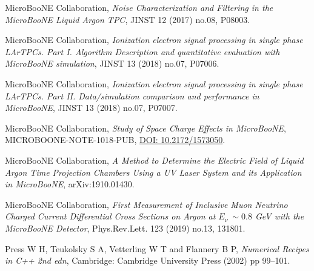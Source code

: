 \documentclass[a4paper]{article}
\begin{document}
\begin{thebibliography}{}
MicroBooNE Collaboration, \emph{Noise Characterization and Filtering in the MicroBooNE Liquid Argon TPC}, JINST 12 (2017) no.08, P08003.

MicroBooNE Collaboration, \emph{Ionization electron signal processing in single phase LArTPCs. Part I. Algorithm Description and quantitative evaluation with MicroBooNE simulation}, JINST 13 (2018) no.07, P07006.

MicroBooNE Collaboration, \emph{Ionization electron signal processing in single phase LArTPCs. Part II. Data/simulation comparison and performance in MicroBooNE}, JINST 13 (2018) no.07, P07007.

MicroBooNE Collaboration, \emph{Study of Space Charge Effects in MicroBooNE}, MICROBOONE-NOTE-1018-PUB, \href{http://inspirehep.net/record/1763018}{DOI: 10.2172/1573050}.

MicroBooNE Collaboration, \emph{A Method to Determine the Electric Field of Liquid Argon Time Projection Chambers Using a UV Laser System and its Application in MicroBooNE},  arXiv:1910.01430.

MicroBooNE Collaboration, \emph{First Measurement of Inclusive Muon Neutrino Charged Current Differential Cross Sections on Argon at $E_\nu ~\sim0.8$ GeV with the MicroBooNE Detector}, Phys.Rev.Lett. 123 (2019) no.13, 131801.

Press W H, Teukolsky S A, Vetterling W T and Flannery B P, \emph{Numerical Recipes in C++ 2nd edn}, Cambridge: Cambridge University Press (2002) pp 99–101.

\end{thebibliography}
\end{document}
